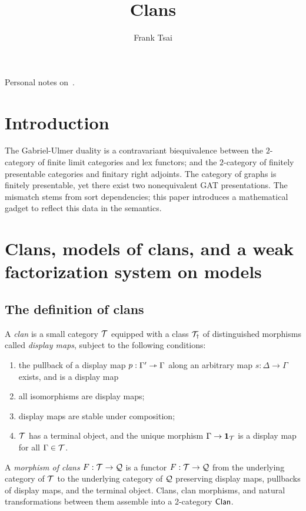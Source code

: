 \documentclass[a4paper]{article}
\title{Clans}
\author{Frank Tsai}
\begin{document}
\maketitle

Personal notes on~\cite{Frey25}.

\section{Introduction}
The Gabriel-Ulmer duality is a contravariant biequivalence between the $2$-category of finite limit categories and lex functors; and the $2$-category of finitely presentable categories and finitary right adjoints.
The category of graphs is finitely presentable, yet there exist two nonequivalent GAT presentations.
The mismatch stems from sort dependencies; this paper introduces a mathematical gadget to reflect this data in the semantics.

\section{Clans, models of clans, and a weak factorization system on models}

\subsection{The definition of clans}
\begin{definition}
  A \emph{clan} is a small category $\mathcal{T}$ equipped with a class $\mathcal{T}_{\dag}$ of distinguished morphisms called \emph{display maps}, subject to the following conditions:
  \begin{enumerate}
  \item the pullback of a display map $p : \Gamma' \rightarrowtriangle \Gamma$ along an arbitrary map $s : \Delta \to \Gamma$ exists, and is a display map
    \begin{center}
    \end{center}
  \item all isomorphisms are display maps;
  \item display maps are stable under composition;
  \item $\mathcal{T}$ has a terminal object, and the unique morphism $\Gamma \to \mathbf{1}_{\mathcal{T}}$ is a display map for all $\Gamma \in \mathcal{T}$.
  \end{enumerate}
  A \emph{morphism of clans} $F : \mathcal{T} \to \mathcal{Q}$ is a functor $F : \mathcal{T} \to \mathcal{Q}$ from the underlying category of $\mathcal{T}$ to the underlying category of $\mathcal{Q}$ preserving display maps, pullbacks of display maps, and the terminal object.
  Clans, clan morphisms, and natural transformations between them assemble into a 2-category $\mathsf{Clan}$.
\end{definition}
\end{document}
